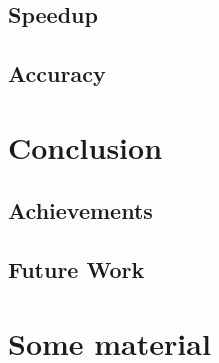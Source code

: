 \documentclass[mscthesis]{usiinfthesis}
\begin{document}
\section{Speedup}
\label{ch:res_speed}
\section{Accuracy}
\label{ch:res_prec}

\chapter{Conclusion}
\label{ch:conc}

\section{Achievements}
\label{ch:conc_ach}

\section{Future Work}
\label{ch:conc_work}

\nocite{*}

\appendix %

\chapter{Some material}

\backmatter


%
%
%
%
%

%


\end{document}

